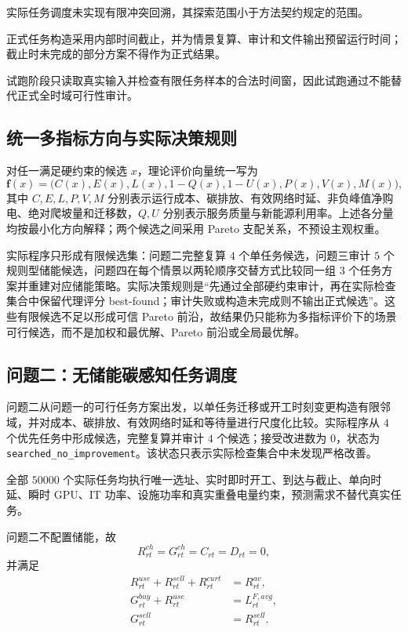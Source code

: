 实际任务调度未实现有限冲突回溯，其探索范围小于方法契约规定的范围。

正式任务构造采用内部时间截止，并为情景复算、审计和文件输出预留运行时间；截止时未完成的部分方案不得作为正式结果。

试跑阶段只读取真实输入并检查有限任务样本的合法时间窗，因此试跑通过不能替代正式全时域可行性审计。


\subsection{统一多指标方向与实际决策规则}

对任一满足硬约束的候选 $x$，理论评价向量统一写为
\begin{equation}
\mathbf f(x)=\bigl(C(x),E(x),L(x),1-Q(x),1-U(x),P(x),V(x),M(x)\bigr),
\end{equation}
其中 $C,E,L,P,V,M$ 分别表示运行成本、碳排放、有效网络时延、非负峰值净购电、绝对爬坡量和迁移数，$Q,U$ 分别表示服务质量与新能源利用率。上述各分量均按最小化方向解释；两个候选之间采用 Pareto 支配关系，不预设主观权重。

实际程序只形成有限候选集：问题二完整复算 $4$ 个单任务候选，问题三审计 $5$ 个规则型储能候选，问题四在每个情景以两轮顺序交替方式比较同一组 $3$ 个任务方案并重建对应储能策略。实际决策规则是“先通过全部硬约束审计，再在实际检查集合中保留代理评分 best-found；审计失败或构造未完成则不输出正式候选”。这些有限候选不足以形成可信 Pareto 前沿，故结果仍只能称为多指标评价下的场景可行候选，而不是加权和最优解、Pareto 前沿或全局最优解。

\subsection{问题二：无储能碳感知任务调度}

问题二从问题一的可行任务方案出发，以单任务迁移或开工时刻变更构造有限邻域，并对成本、碳排放、有效网络时延和等待量进行尺度化比较。实际程序从 $4$ 个优先任务中形成候选，完整复算并审计 $4$ 个候选；接受改进数为 $0$，状态为 \texttt{searched\_no\_improvement}。该状态只表示实际检查集合中未发现严格改善。

全部 $50000$ 个实际任务均执行唯一选址、实时即时开工、到达与截止、单向时延、瞬时 GPU、IT 功率、设施功率和真实重叠电量约束，预测需求不替代真实任务。

问题二不配置储能，故
\begin{equation}
R_{rt}^{ch}=G_{rt}^{ch}=C_{rt}=D_{rt}=0,
\end{equation}
并满足
\begin{align}
R_{rt}^{use}+R_{rt}^{sell}+R_{rt}^{curt}&=R_{rt}^{av},\\
G_{rt}^{buy}+R_{rt}^{use}&=L_{rt}^{F,avg},\\
G_{rt}^{sell}&=R_{rt}^{sell}.
\end{align}

